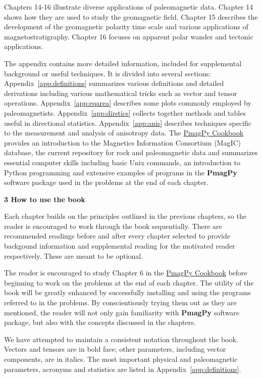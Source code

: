 Chapters 14-16 illustrate diverse applications of paleomagnetic data.   Chapter 14 shows how  they are used to study the geomagnetic field.  Chapter 15 describes the development of the geomagnetic polarity time scale and various applications of magnetostratigraphy.  Chapter 16 focuses on apparent polar wander and tectonic applications.   

The appendix contains more detailed information,  included for supplemental background or useful techniques.  It is divided into several sections:  Appendix~\ref{app:definitions} summarizes various definitions and detailed derivations including various mathematical tricks such as vector and tensor operations.  Appendix~\ref{app:eqarea} describes some plots commonly employed by paleomagnetists.   Appendix~\ref{app:dirstics} collects together methods and tables useful in directional  statistics.    Appendix~\ref{app:anis} describes techniques specific to the measurement and analysis of anisotropy data.   The   \href{http://earthref.org/PmagPy/cookbook/}{PmagPy Cookbook}  provides an introduction to the Magnetics Information Consortium (MagIC) database, the current repository for rock and paleomagnetic data and  summarizes essential computer skills including basic Unix commands,  an introduction to Python programming and extensive examples of  programs in the  {\bf PmagPy}  software package  used in the problems at the end of each chapter.  

\noindent
{\bf 3 How to use the book}

 Each chapter builds on
the principles outlined in the previous chapters, so the reader is encouraged
to work through the book sequentially.    There are recommended readings before and after every chapter selected to provide backgound information and supplemental reading for the motivated reader respectively.  These are meant to be optional.  

The reader is encouraged to study  Chapter 6 in the  \href{http://earthref.org/PmagPy/cookbook/}{PmagPy Cookbook} before beginning to work on the problems at the end of each chapter.  The utility of the book
will be greatly enhanced by successfully installing and using the programs
referred to in the problems.     By conscientiously trying them out  as they are mentioned, the  reader
will not only gain familiarity with  {\bf PmagPy} software package, but also
with the concepts discussed in the chapters. 

We  have attempted to maintain a consistent notation throughout the book.
Vectors  and tensors are in bold face; other parameters, including
vector components, are in italics.  The most important 
physical and paleomagnetic parameters, acronyms and statistics are listed in Appendix~\ref{app:definitions}.  

